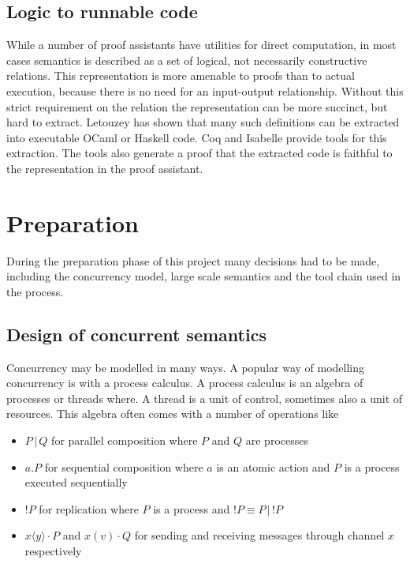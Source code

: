 \documentclass[12pt,twoside,notitlepage]{report}
\begin{document}
\section{Logic to runnable code}
While a number of proof assistants have utilities for direct computation, in most cases semantics is described as a set of logical, not necessarily constructive relations. This representation is more amenable to proofs than to actual execution, because there is no need for an input-output relationship. Without this strict requirement on the relation the representation can be more succinct, but hard to extract. Letouzey\cite{letouzey2008extraction} has shown that many such definitions can be extracted into executable OCaml or Haskell code.  Coq and Isabelle provide tools for this extraction. The tools also generate a proof that the extracted code is faithful to the representation in the proof assistant.


\chapter{Preparation}
During the preparation phase of this project many decisions had to be made, including the concurrency model, large scale semantics and the tool chain used in the process.

\section{Design of concurrent semantics}
Concurrency may be modelled in many ways. A popular way of modelling concurrency is with a process calculus. A process calculus is an algebra of processes or threads where. A thread is a unit of control, sometimes also a unit of resources. This algebra often comes with a number of operations like 
\begin{itemize}
\item{$ P\, | \, Q $  for parallel composition where $ P $ and $ Q $ are processes}
\item{ $ a.P  $ for sequential composition where $ a $ is an atomic action and $ P $ is a process executed sequentially}
\item{$ !P $ for replication where $ P $ is a process and $ !P \equiv P \, | \, !P $}
\item{$ x\langle y \rangle \cdot P $ and $ x(v) \cdot Q $ for sending and receiving messages through channel $ x $ respectively} 
\end{itemize}
\end{document}

